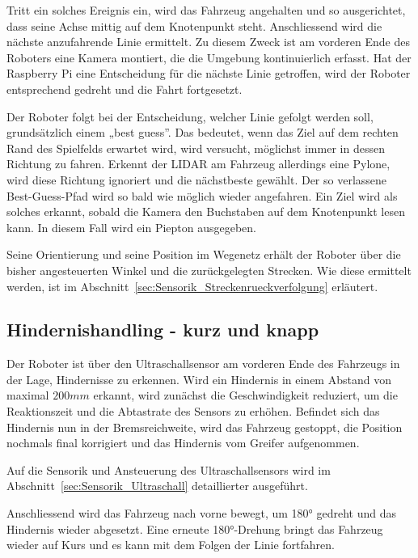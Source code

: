 \documentclass[main.tex]{subfiles} %
\begin{document}
Tritt ein solches Ereignis ein, wird das Fahrzeug angehalten und so
ausgerichtet, dass seine Achse mittig auf dem Knotenpunkt steht. Anschliessend
wird die nächste anzufahrende Linie ermittelt. Zu diesem Zweck ist am vorderen
Ende des Roboters eine Kamera montiert, die die Umgebung kontinuierlich
erfasst. Hat der Raspberry Pi eine Entscheidung für die nächste Linie
getroffen, wird der Roboter entsprechend gedreht und die Fahrt fortgesetzt.

Der Roboter folgt bei der Entscheidung, welcher Linie gefolgt werden soll,
grundsätzlich einem „best guess”. Das bedeutet, wenn das Ziel auf dem rechten
Rand des Spielfelds erwartet wird, wird versucht, möglichst immer in dessen
Richtung zu fahren. Erkennt der LIDAR am Fahrzeug allerdings eine Pylone, wird
diese Richtung ignoriert und die nächstbeste gewählt. Der so verlassene
Best-Guess-Pfad wird so bald wie möglich wieder angefahren. Ein Ziel wird als
solches erkannt, sobald die Kamera den Buchstaben auf dem Knotenpunkt lesen
kann. In diesem Fall wird ein Piepton ausgegeben.

Seine Orientierung und seine Position im Wegenetz erhält der Roboter über die
bisher angesteuerten Winkel und die zurückgelegten Strecken. Wie diese
ermittelt werden, ist im Abschnitt~\ref{sec:Sensorik_Streckenrueckverfolgung}
erläutert.


\subsection{Hindernishandling - kurz und knapp}

Der Roboter ist über den Ultraschallsensor am vorderen Ende des Fahrzeugs in
der Lage, Hindernisse zu erkennen. Wird ein Hindernis in einem Abstand von
maximal $200 mm$ erkannt, wird zunächst die Geschwindigkeit reduziert, um die
Reaktionszeit und die Abtastrate des Sensors zu erhöhen. Befindet sich das
Hindernis nun in der Bremsreichweite, wird das Fahrzeug gestoppt, die Position
nochmals final korrigiert und das Hindernis vom Greifer aufgenommen.

Auf die Sensorik und Ansteuerung des Ultraschallsensors wird im
Abschnitt~\ref{sec:Sensorik_Ultraschall} detaillierter ausgeführt.

Anschliessend wird das Fahrzeug nach vorne bewegt, um 180° gedreht und das
Hindernis wieder abgesetzt. Eine erneute 180°-Drehung bringt das Fahrzeug
wieder auf Kurs und es kann mit dem Folgen der Linie fortfahren.
\end{document}
